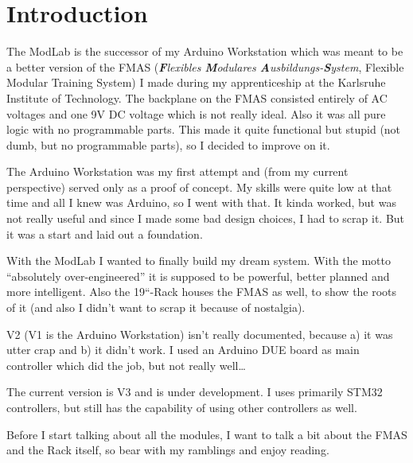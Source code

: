 \chapter{Introduction}

The ModLab is the successor of my Arduino Workstation which was meant to be a better version of the FMAS (\textit{\textbf{F}lexibles \textbf{M}odulares \textbf{A}usbildungs-\textbf{S}ystem}, Flexible Modular Training System) I made during my apprenticeship at the Karlsruhe Institute of Technology. The backplane on the FMAS consisted entirely of AC voltages and one 9V DC voltage which is not really ideal. Also it was all pure logic with no programmable parts. This made it quite functional but stupid (not dumb, but no programmable parts), so I decided to improve on it. 

The Arduino Workstation was my first attempt and (from my current perspective) served only as a proof of concept. My skills were quite low at that time and all I knew was Arduino, so I went with that. It kinda worked, but was not really useful and since I made some bad design choices, I had to scrap it. But it was a start and laid out a foundation. 

With the ModLab I wanted to finally build my dream system. With the motto ``absolutely over-engineered'' it is supposed to be powerful, better planned and more intelligent. Also the 19``-Rack houses the FMAS as well, to show the roots of it (and also I didn't want to scrap it because of nostalgia). 

V2 (V1 is the Arduino Workstation) isn't really documented, because a) it was utter crap and b) it didn't work. I used an Arduino DUE board as main controller which did the job, but not really well\dots

The current version is V3 and is under development. I uses primarily STM32 controllers, but still has the capability of using other controllers as well. 

\hspace{1cm}

Before I start talking about all the modules, I want to talk a bit about the FMAS and the Rack itself, so bear with my ramblings and enjoy reading.